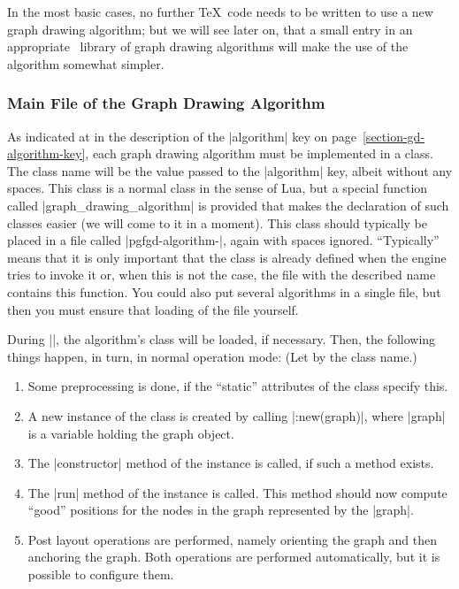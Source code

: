 In the most basic cases, no further \TeX\ code needs to be written to
use a new graph drawing algorithm; but we will see later on, that a
small entry in an appropriate \pgfname\ library of graph drawing
algorithms will make the use of the algorithm somewhat simpler.\


\subsubsection{Main File of the Graph Drawing Algorithm}

As indicated at in the description of the |algorithm| key on
page~\ref{section-gd-algorithm-key}, each graph drawing algorithm  
must be implemented in a class. The class name will be the value
passed to the |algorithm| key, albeit without any spaces. This class
is a normal class in the sense of Lua, but a special function called
|graph_drawing_algorithm| is provided that makes the declaration of
such classes easier (we will come to it in a moment). This class
should typically be placed in a file called
|pgfgd-algorithm-|, again with spaces
ignored. ``Typically'' means that it is only 
important that the class is already defined when the engine
tries to invoke it or, when this is not the case, the file with the
described name contains this function. You could also put several
algorithms in a single file, but then you must ensure that loading of
the file yourself.

During |\pgfgdendscope|, the algorithm's class will be loaded, if
necessary. Then, the following things happen, in turn, in normal
operation mode: (Let  by the class name.)

\begin{enumerate}
\item Some preprocessing is done, if the ``static'' attributes of the
  class specify this.
\item A new instance of the class is created by calling
  |:new(graph)|, where |graph| is a variable holding the
  graph object. 
\item The |constructor| method of the instance is called, if such a
  method exists.
\item The |run| method of the instance is called. This method should now
  compute ``good'' positions for the nodes in the graph represented by
  the |graph|.
\item Post layout operations are performed, namely orienting the
  graph and then anchoring the graph. Both operations are performed
  automatically, but it is possible to configure them.
\end{enumerate}

